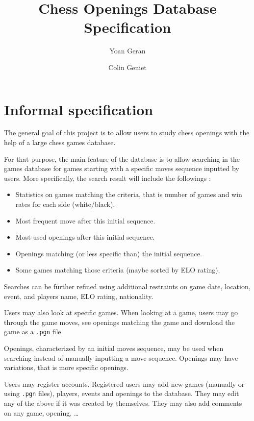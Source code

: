 \documentclass{article}
\begin{document}
\title{Chess Openings Database Specification}
\author{Yoan Geran \and Colin Geniet}
\maketitle

\tableofcontents

\section{Informal specification}
The general goal of this project is to allow users to study chess openings
with the help of a large chess games database.

For that purpose, the main feature of the database is to allow searching
in the games database for games starting with a specific moves sequence
inputted by users.
More specifically, the search result will include the followings :
\begin{itemize}[noitemsep]
\item Statistics on games matching the criteria, that is number of games and
win rates for each side (white/black).
\item Most frequent move after this initial sequence.
\item Most used openings after this initial sequence.
\item Openings matching (or less specific than) the initial sequence.
\item Some games matching those criteria (maybe sorted by ELO rating).
\end{itemize}

Searches can be further refined using additional restraints on game date, location,
event, and players name, ELO rating, nationality.

Users may also look at specific games.
When looking at a game, users may go through the game moves,
see openings matching the game and download the game as a \verb|.pgn| file.

Openings, characterized by an initial moves sequence, may be used when searching
instead of manually inputting a move sequence.
Openings may have variations, that is more specific openings.

Users may register accounts. Registered users may add new games (manually or using \verb|.pgn| files),
players, events and openings to the database. They may edit any of the above if it was
created by themselves. They may also add comments on any game, opening, \dots
\end{document}

